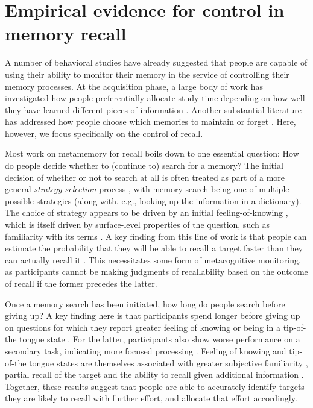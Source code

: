 \section{Empirical evidence for control in memory recall}

A number of behavioral studies have already suggested that people are capable of using their ability to monitor their memory in the service of controlling their memory processes. At the acquisition phase, a large body of work has investigated how people preferentially allocate study time depending on how well they have learned different pieces of information \citep{dunlosky1998training,metcalfe2009metacognitive,gureckis2012selfdirected}. Another substantial literature has addressed how people choose which memories to maintain or forget \citep{castel2007adaptive,williams2013benefit,suchow2016deciding,hu2019role}. Here, however, we focus specifically on the control of recall.

Most work on metamemory for recall boils down to one essential question: How do people decide whether to (continue to) search for a memory? The initial decision of whether or not to search at all is often treated as part of a more general \emph{strategy selection} process \citep{reder1988strategic}, with memory search being one of multiple possible strategies (along with, e.g., looking up the information in a dictionary). The choice of strategy appears to be driven by an initial feeling-of-knowing \citep{nhouyvanisvong1998rapid}, which is itself driven by surface-level properties of the question, such as familiarity with its terms \citep{reder1992determines}. A key finding from this line of work is that people can estimate the probability that they will be able to recall a target faster than they can actually recall it \citep{reder1987strategy}. This necessitates some form of metacognitive monitoring, as participants cannot be making judgments of recallability based on the outcome of recall if the former precedes the latter.

Once a memory search has been initiated, how long do people search before giving up? A key finding here is that participants spend longer before giving up on questions for which they report greater feeling of knowing \citep{nelson1984comparison,nhouyvanisvong1998rapid,gruneberg1977methodological,lachman1979metamemory} or being in a tip-of-the tongue state \citep{schwartz2001relation}. For the latter, participants also show worse performance on a secondary task, indicating more focused processing \citep{ryan1982motivated}. Feeling of knowing and tip-of-the tongue states are themselves associated with greater subjective familiarity \citep{reder1988strategic}, partial recall of the target \citep{brown1966tip,koriat1993how,schacter1985attribute} and the ability to recall given additional information \citep{gruneberg1974feeling}. Together, these results suggest that people are able to accurately identify targets they are likely to recall with further effort, and allocate that effort accordingly.

